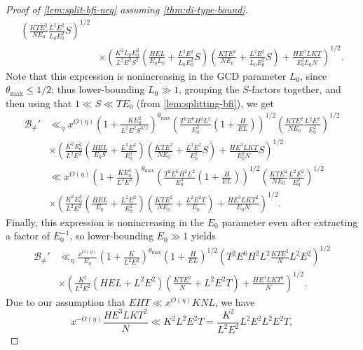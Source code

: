 \documentclass[reqno,11pt]{amsart}
\theoremstyle{definition}
\theoremstyle{remark}
\numberwithin{equation}{section}
\newcommand{\mB}{\mathcal{B}}
\begin{document}
\begin{proof}[Proof of \cref{lem:split-bfi-neq} assuming \cref{thm:di-type-bound}]
\[\begin{aligned}
    \left(\frac{KTE^2}{NE_0} \frac{L^2 E^2 }{L_0 E_0^2 } S \right)^{1/2}
    \\
    &\times
    \left(\frac{K^2 L_0 E_0^2}{L^2 E^2 S^2} \left(\frac{HEL}{E_0L_0} + \frac{L^2 E^2}{L_0 E_0^2} S\right)\left(\frac{KTE^2}{NE_0} + \frac{L^2 E^2}{L_0 E_0^2}S\right) + \frac{HE^3L K T}{E_0^2L_0 N}\right)^{1/2}.
\end{aligned}
\]
Note that this expression is nonincreasing in the GCD parameter $L_0$, since $\theta_{\max} \le 1/2$; thus lower-bounding $L_0 \gg 1$, grouping the $S$-factors together, and then using that $1 \ll S \ll TE_0$ (from \cref{lem:splitting-bfi}), we get
\[
\begin{aligned}
    \mB_{\neq}' &\ll_\eta x^{O(\eta)} \left(1 + \frac{K E_0^2}{L^2 E^2 S^{3/2}}\right)^{\theta_{\max}}
    \left(\frac{T^2 E^6 H^2 L^2}{E_0^3} \left(1 + \frac{H}{EL}\right)\right)^{1/2} 
    \left(\frac{KTE^2}{NE_0} \frac{L^2 E^2}{E_0^2} \right)^{1/2}
    \\
    &\times
    \left(\frac{K^2 E_0^2}{L^2 E^2} \left(\frac{HEL}{E_0 S} + \frac{L^2 E^2}{E_0^2}\right)\left(\frac{KTE^2}{NE_0} + \frac{L^2 E^2}{E_0^2}S\right) + \frac{HE^3L K T}{E_0^2 N} S\right)^{1/2}
    \\
    &\ll x^{O(\eta)} \left(1 + \frac{K E_0^2}{L^2 E^2}\right)^{\theta_{\max}}
    \left(\frac{T^2 E^6 H^2 L^2}{E_0^3} \left(1 + \frac{H}{EL}\right)\right)^{1/2} 
    \left(\frac{KTE^2}{NE_0} \frac{L^2 E^2}{E_0^2} \right)^{1/2}
    \\
    &\times
    \left(\frac{K^2 E_0^2}{L^2 E^2} \left(\frac{HEL}{E_0} + \frac{L^2 E^2}{E_0^2}\right)\left(\frac{KTE^2}{NE_0} + \frac{L^2 E^2 T}{E_0}\right) + \frac{HE^3L K T^2}{E_0 N} \right)^{1/2}.
\end{aligned}
\]
Finally, this expression is nonincreasing in the $E_0$ parameter even after extracting a factor of $E_0^{-1}$, so lower-bounding $E_0 \gg 1$ yields
\[
\begin{aligned}
    \mB_{\neq}' &\ll_\eta \frac{x^{O(\eta)}}{E_0}
    \left(1 + \frac{K}{L^2 E^2}\right)^{\theta_{\max}}
    \left(1 + \frac{H}{EL}\right)^{1/2} 
    \left(T^2 E^6 H^2 L^2 \frac{KTE^2}{N} L^2 E^2\right)^{1/2}
    \\
    &\times
    \left(\frac{K^2}{L^2 E^2} \left(HEL + L^2 E^2\right)\left(\frac{KTE^2}{N} + L^2 E^2 T\right) + \frac{HE^3L K T^2}{N} \right)^{1/2}.
\end{aligned}
\]
Due to our assumption that $EHT \ll x^{O(\eta)} KNL$, we have
\[
    x^{-O(\eta)}\frac{HE^3LKT^2}{N} \ll  K^2 L^2 E^2 T
    =
    \frac{K^2}{L^2E^2} L^2E^2 L^2 E^2 T,
\]
\end{proof}
\end{document}
